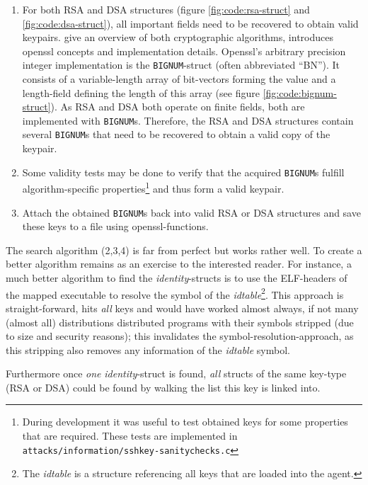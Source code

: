 \begin{enumerate}
	\item For both RSA and DSA structures (figure \ref{fig:code:rsa-struct}
		and \ref{fig:code:dsa-struct}), all important fields need to be
		recovered to obtain valid keypairs.  \cite{applied_crypto:1996,
		handbook_applied_crypto:2001} give an overview of both
		cryptographic algorithms, \cite{openssl_book:2002} introduces
		openssl concepts and implementation details. Openssl's arbitrary
		precision integer implementation is the \texttt{BIGNUM}-struct
		(often abbreviated ``BN'').  It consists of a variable-length
		array of bit-vectors forming the value and a length-field
		defining the length of this array (see figure
		\ref{fig:code:bignum-struct}).  As RSA and DSA both operate on
		finite fields, both are implemented with \texttt{BIGNUM}s.
		Therefore, the RSA and DSA structures contain several
		\texttt{BIGNUM}s that need to be recovered to obtain a valid
		copy of the keypair.

	\item Some validity tests may be done to verify that the acquired
	\texttt{BIGNUM}s fulfill algorithm-specific properties\footnote{During
	development it was useful to test obtained keys for some properties that
	are required. These tests are implemented in
	\texttt{attacks/information/sshkey-sanitychecks.c}} and thus form a
	valid keypair.

	\item Attach the obtained \texttt{BIGNUM}s back into valid RSA or DSA
	structures and save these keys to a file using openssl-functions.
	
\end{enumerate}
	
The search algorithm (2,3,4) is far from perfect but works rather well.  To
create a better algorithm remains as an exercise to the interested reader. For
instance, a much better algorithm to find the \emph{identity}-structs is to use
the ELF-headers of the mapped executable to resolve the symbol of the
\emph{idtable}\footnote{The \emph{idtable} is a structure referencing all keys
that are loaded into the agent.}. This approach is straight-forward, hits
\emph{all} keys and would have worked almost always, if not many (almost all)
distributions distributed programs with their symbols stripped (due to size and
security reasons); this invalidates the symbol-resolution-approach, as this
stripping also removes any information of the \emph{idtable} symbol.

Furthermore once \emph{one} \emph{identity}-struct is found, \emph{all} structs
of the same key-type (RSA or DSA) could be found by walking the list this key is
linked into.

